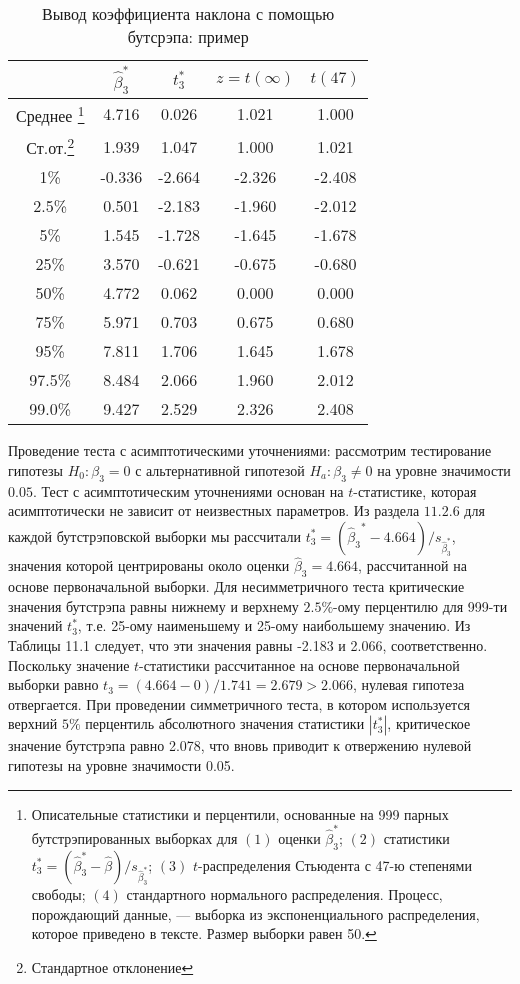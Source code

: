\begin{table}[h]
\begin{center}
\caption{\label{tab:slope} Вывод коэффициента наклона с помощью бутсрэпа: пример}
\begin{minipage}{9cm}
\begin{tabular}{ccccc}
\hline
\hline
& $\hat{\beta}^*_3$ & $t^*_3$ & $z = t(\infty)$ & $t(47)$ \\ 
\hline 
Среднее \footnote{Описательные статистики и перцентили, основанные на 999 парных бутстрэпированных выборках для $(1)$ оценки $\hat{\beta}^*_3$; $(2)$ статистики $t^*_3 = (\hat{\beta}^*_3 - \hat{\beta})/s_{\hat{\beta}^*_3}$;
 $(3)$ $t$-распределения Стьюдента с 47-ю степенями свободы; $(4)$ стандартного нормального распределения. Процесс, порождающий данные, --- выборка из экспоненциального распределения, которое приведено в тексте. Размер выборки равен 50.} & 4.716 & 0.026 & 1.021 & 1.000 \\ 
Ст.от.\footnote{Стандартное отклонение} & 1.939 & 1.047 & 1.000 & 1.021 \\
1\% & -0.336 & -2.664 & -2.326 & -2.408 \\
2.5\% & 0.501 & -2.183 & -1.960 & -2.012 \\
5\% & 1.545 & -1.728 & -1.645 & -1.678 \\
25\% & 3.570 & -0.621 & -0.675 & -0.680 \\
50\% & 4.772 & 0.062 & 0.000 & 0.000 \\
75\% & 5.971 & 0.703 & 0.675 & 0.680 \\
95\% & 7.811 & 1.706 & 1.645 & 1.678 \\
97.5\% & 8.484 & 2.066 & 1.960 & 2.012 \\
99.0\% & 9.427 & 2.529 & 2.326 & 2.408 \\
\hline
\hline
\end{tabular}
\end{minipage}
\end{center}
\end{table} 

Проведение теста с асимптотическими уточнениями: рассмотрим тестирование гипотезы $H_0:\beta_{3}=0$ с альтернативной гипотезой $H_a: \beta_3 \neq 0$ на уровне значимости $0.05$. Тест с асимптотическим уточнениями основан на $t$-статистике, которая асимптотически не зависит от неизвестных параметров. Из раздела $11.2.6$ для каждой бутстрэповской выборки мы рассчитали $t_3^*=({\hat{\beta}_3}^*-4.664)/s_{\hat{\beta}_3^*}$, значения которой центрированы около оценки $\hat{\beta}_3=4.664$, рассчитанной на основе первоначальной выборки. Для несимметричного теста критические значения бутстрэпа равны нижнему и верхнему $2.5\%$-ому перцентилю для 999-ти значений $t_3^*$, т.е. 25-ому наименьшему и 25-ому наибольшему значению. Из Таблицы 11.1 следует, что эти значения равны -2.183 и 2.066, соответственно. Поскольку значение $t$-статистики рассчитанное на основе первоначальной выборки равно $t_3=(4.664-0)/1.741=2.679 > 2.066$, нулевая гипотеза отвергается. При проведении симметричного теста, в котором используется верхний $5\%$ перцентиль абсолютного значения статистики $|t_3^*|$, критическое значение бутстрэпа равно 2.078, что вновь приводит к отвержению нулевой гипотезы на уровне значимости 0.05.


